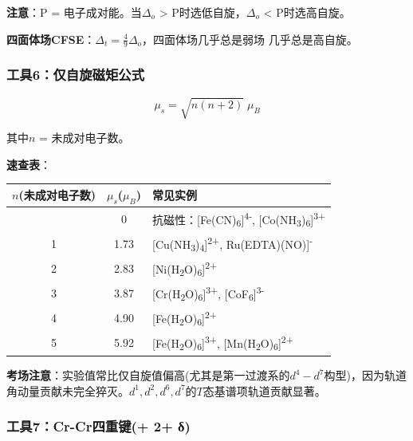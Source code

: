 \textbf{注意}：P = 电子成对能。当\(\Delta_o\) \textgreater{} P时选低自旋，\(\Delta_o\) \textless{} P时选高自旋。

\textbf{四面体场CFSE}：\(\Delta_t = \frac{4}{9}\Delta_o\)，四面体场几乎总是弱场 \箭 几乎总是高自旋。

\subsubsection{工具6：仅自旋磁矩公式}\label{ux5de5ux51776ux4ec5ux81eaux65cbux78c1ux77e9ux516cux5f0f}

\[\boxed{\mu_s = \sqrt{n(n+2)} \;\mu_B}\]

其中\(n\) = 未成对电子数。

\textbf{速查表}：

{\def\LTcaptype{none} %
\begin{longtable}[]{@{}ccl@{}}
\toprule\noalign{}
\(n\)(未成对电子数) & \(\mu_s\)(\(\mu_B\)) & 常见实例 \\
\midrule\noalign{}
\endhead
\bottomrule\noalign{}
\endlastfoot
0 & 0 & 抗磁性：{[}Fe(CN)\textsubscript{6}{]}\textsuperscript{4-}, {[}Co(NH\textsubscript{3})\textsubscript{6}{]}\textsuperscript{3+} \\
1 & 1.73 & {[}Cu(NH\textsubscript{3})\textsubscript{4}{]}\textsuperscript{2+}, Ru(EDTA)(NO){]}\textsuperscript{-} \\
2 & 2.83 & {[}Ni(H\textsubscript{2}O)\textsubscript{6}{]}\textsuperscript{2+} \\
3 & 3.87 & {[}Cr(H\textsubscript{2}O)\textsubscript{6}{]}\textsuperscript{3+}, {[}CoF\textsubscript{6}{]}\textsuperscript{3-} \\
4 & 4.90 & {[}Fe(H\textsubscript{2}O)\textsubscript{6}{]}\textsuperscript{2+} \\
5 & 5.92 & {[}Fe(H\textsubscript{2}O)\textsubscript{6}{]}\textsuperscript{3+}, {[}Mn(H\textsubscript{2}O)\textsubscript{6}{]}\textsuperscript{2+} \\
\end{longtable}
}

\textbf{考场注意}：实验值常比仅自旋值偏高(尤其是第一过渡系的\(d^4-d^7\)构型)，因为轨道角动量贡献未完全猝灭。\(d^1, d^2, d^6, d^7\)的\(T\)态基谱项轨道贡献显著。

\subsubsection{\texorpdfstring{工具7：Cr-Cr四重键( + 2\派 + δ)}{工具7：Cr-Cr四重键(+ 2+ δ)}}\label{ux5de5ux51777cr-crux56dbux91cdux952e-2-ux3b4}

